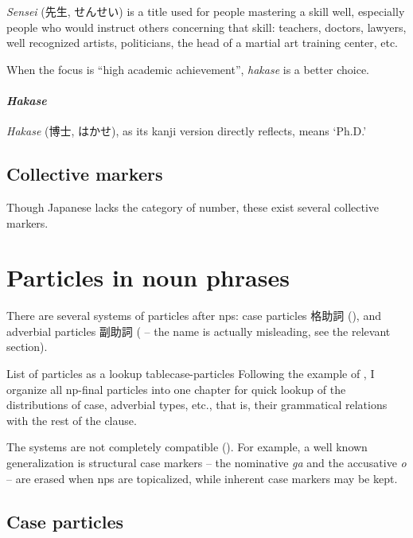 \documentclass[UTF8, a4paper, oneside, scheme=plain]{ctexrep}
\newcommand{\corpus}[1]{\emph{#1}}
\newcommand{\translate}[1]{`#1'}
\begin{document}
\corpus{Sensei} (先生, せんせい) is a title used for people mastering a skill well, 
especially people who would instruct others concerning that skill:
teachers, doctors, lawyers, well recognized artists, politicians,
the head of a martial art training center, etc.

When the focus is ``high academic achievement'', \corpus{hakase} is a better choice.

\subsubsection{\corpus{Hakase}}

\corpus{Hakase} (博士, はかせ), as its kanji version directly reflects, means \translate{Ph.D.}

\section{Collective markers}

Though Japanese lacks the category of number,
these exist several collective markers.

\chapter{Particles in noun phrases}\label{chap:particle-in-np}

There are several systems of particles after \ac{np}s:
case particles 格助詞 (),
and adverbial particles 副助詞 ( 
-- the name is actually misleading, see the relevant section).

\begin{theorybox}{List of particles as a lookup table}{case-particles}
    Following the example of \citet{jacques2021grammar},
    I organize all \ac{np}-final particles into one chapter 
    for quick lookup of the distributions of case, adverbial types, etc.,
    that is, their grammatical relations with the rest of the clause.
\end{theorybox}

The systems are not completely compatible ().
For example, a well known generalization is structural case markers 
-- the nominative \corpus{ga} and the accusative \corpus{o} -- 
are erased when \ac{np}s are topicalized,
while inherent case markers may be kept.

\section{Case particles}\label{sec:case-particle}
\end{document}
